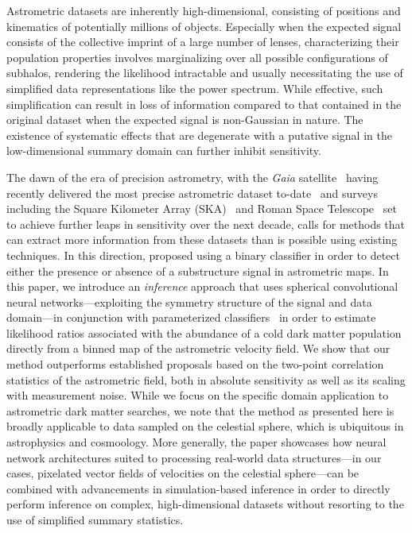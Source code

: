 \documentclass[twocolumn,linenumbers,anonymous]{aastex631}
\newcommand{\changes}[1]{{{\color{red}#1}}}
\begin{document}
Astrometric datasets are inherently high-dimensional, consisting of positions and kinematics of potentially millions of objects. Especially when the expected signal consists of the collective imprint of a large number of lenses, characterizing their population properties involves marginalizing over all possible configurations of subhalos, rendering the likelihood intractable and usually necessitating the use of simplified data representations like the power spectrum. While effective, such simplification can result in loss of information compared to that contained in the original dataset when the expected signal is non-Gaussian in nature. The existence of systematic effects that are degenerate with a putative signal in the low-dimensional summary domain can further inhibit sensitivity. 

The dawn of the era of precision astrometry, with the \emph{Gaia} satellite~\citep{2016A&A...595A...1G} having recently delivered the most precise astrometric dataset to-date~\citep{2018A&A...616A...1G,2018A&A...616A...2L,2021A&A...649A...1G} and surveys including the Square Kilometer Array (SKA)~\citep{Fomalont:2004hr,Jarvis:2015tqa} and Roman Space Telescope~\citep{2019JATIS...5d4005W} set to achieve further leaps in sensitivity over the next decade, calls for methods that can extract more information from these datasets than is possible using existing techniques. In this direction, \citet{Vattis:2020kaa} proposed using a binary classifier in order to detect either the presence or absence of a substructure signal in astrometric maps. In this paper, we introduce an \emph{inference} approach that uses spherical convolutional neural networks---exploiting the symmetry structure of the signal and data domain---in conjunction with parameterized classifiers~\citep{Cranmer:2015bka,Baldi:2016fzo} in order to estimate likelihood ratios associated with the abundance of a cold dark matter population directly from a binned map of the astrometric velocity field. 
We show that our method outperforms established proposals based on the two-point correlation statistics of the astrometric field, both in absolute sensitivity as well as its scaling with measurement noise. 
\changes{While we focus on the specific domain application to astrometric dark matter searches, we note that the method as presented here is broadly applicable to data sampled on the celestial sphere, which is ubiquitous in astrophysics and cosmoology. More generally, the paper showcases how neural network architectures suited to processing real-world data structures---in our cases, pixelated vector fields of velocities on the celestial sphere---can be combined with advancements in simulation-based inference in order to directly perform inference on complex, high-dimensional datasets without resorting to the use of simplified summary statistics.}
\end{document}
